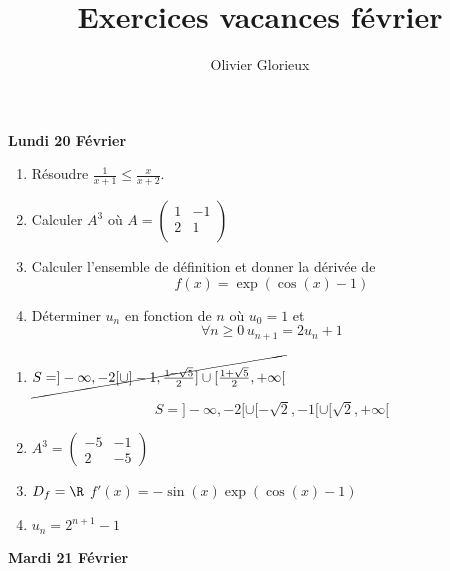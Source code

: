 \documentclass[a4paper, 11pt,reqno]{article}
\author{Olivier Glorieux}
\begin{document}
\title{Exercices vacances février}
\vspace{0,5cm}

\begin{center}
\textbf{Lundi 20 Février }
\end{center}
\begin{enumerate}
\item Résoudre $\frac{1}{x+1}\leq \frac{x}{x+2}$.
\item Calculer $A^3$ où $A=\begin{pmatrix}
1&-1\\
2&1\\
\end{pmatrix}$
\item Calculer l'ensemble de définition et donner la dérivée de $$f(x) =\exp(\cos(x)-1)$$
\item Déterminer $u_n$ en fonction de $n$ où $u_0=1$ et 
$$\forall n \geq 0\, u_{n+1} =2u_n+1$$
\end{enumerate}

\begin{correction}
\begin{enumerate}

\item $\cancel{S=]-\infty, -2[ \cup ]-1,\frac{1-\sqrt{5}}{2}] \cup [\frac{1+\sqrt{5}}{2},+\infty[}$

$$S=]-\infty, -2[ \cup [-\sqrt{2},-1[ \cup [\sqrt{2},+\infty[$$
\item $A^3= \begin{pmatrix}
-5& -1\\
2&-5 
\end{pmatrix}$
\item $D_f=\R$
$f'(x) = -\sin(x)\exp(\cos(x)-1)$
\item $u_n =2^{n+1}-1$ 
\end{enumerate}
\end{correction}
 
\begin{center}
\textbf{Mardi 21 Février }
\end{center}
\end{document}
